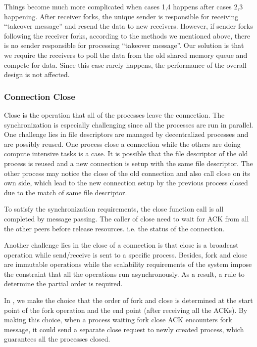 Things become much more complicated when cases 1,4 happens after cases 2,3 happening. After receiver forks, the unique sender is responsible for receiving ``takeover message'' and resend the data to new receivers. However, if sender forks following the receiver forks, according to the methods we mentioned above, there is no sender responsible for processing ``takeover message''. Our solution is that we require the receivers to poll the data from the old shared memory queue and compete for data. Since this case rarely happens, the performance of the overall design is not affected.

\subsubsection{Connection Close}

Close is the operation that all of the processes leave the connection. The synchronization is  especially challenging since all the processes are run in parallel. One challenge lies in file descriptors are managed by decentralized processes and are possibly reused. One process close a connection while the others are doing compute intensive tasks is a case. It is possible that the file descriptor of the old process is reused and a new connection is setup with the same file descriptor. The other process may notice the close of the old connection and also call close on its own side, which lead to the new connection setup by the previous process closed due to the match of same file descriptor. 

To satisfy the synchronization requirements, the close function call is all completed by message passing. The caller of close need to wait for ACK from all the other peers before release resources. i.e. the status of the connection.

Another challenge lies in the close of a connection is that close is a broadcast operation while send/receive is sent to a specific process. Besides, fork and close are immutable operations while the scalability requirements of the system impose the constraint that all the operations run asynchronously. As a result, a rule to determine the partial order is required.

In \libipc, we make the choice that the order of fork and close is determined at the start point of the fork operation and the end point (after receiving all the ACKs). By making this choice, when a process waiting fork close ACK encounters fork message, it could send a separate close request to newly created process, which guarantees all the processes closed.
  
